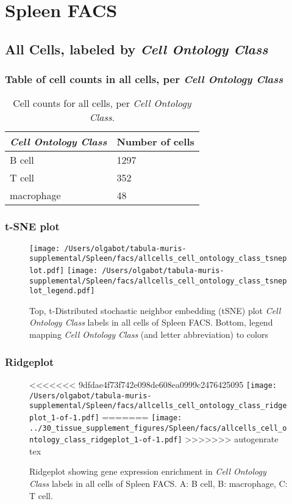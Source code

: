 \clearpage
\section{Spleen FACS}

\subsection{All Cells, labeled by \emph{Cell Ontology Class}}
\subsubsection{Table of cell counts in all cells, per \emph{Cell Ontology Class}}\begin{table}[h]
\centering
\label{my-label}
\begin{tabular}{@{}ll@{}}
\toprule

\emph{Cell Ontology Class}& Number of cells \\ \midrule
B cell & 1297 \\

T cell & 352 \\

macrophage & 48 \\
\bottomrule
\end{tabular}
\caption{Cell counts for all cells, per \emph{Cell Ontology Class}.}
\end{table}

\clearpage
\subsubsection{t-SNE plot}
\begin{figure}[h]
\centering
\texttt{[image: /Users/olgabot/tabula-muris-supplemental/Spleen/facs/allcells\_cell\_ontology\_class\_tsneplot.pdf]}
\texttt{[image: /Users/olgabot/tabula-muris-supplemental/Spleen/facs/allcells\_cell\_ontology\_class\_tsneplot\_legend.pdf]}
\caption{Top, t-Distributed stochastic neighbor embedding (tSNE) plot  \emph{Cell Ontology Class} labels in all cells of Spleen FACS. Bottom, legend mapping \emph{Cell Ontology Class} (and letter abbreviation) to colors}
\end{figure}


\clearpage

\subsubsection{Ridgeplot}
\begin{figure}[h]
\centering
<<<<<<< 9dfdae4f73f742e098de608ea0999c2476425095
\texttt{[image: /Users/olgabot/tabula-muris-supplemental/Spleen/facs/allcells\_cell\_ontology\_class\_ridgeplot\_1-of-1.pdf]}
=======
\texttt{[image: ../30\_tissue\_supplement\_figures/Spleen/facs/allcells\_cell\_ontology\_class\_ridgeplot\_1-of-1.pdf]}
>>>>>>> autogenrate tex

\caption{ Ridgeplot  showing gene expression enrichment in \emph{Cell Ontology Class} labels in all cells of Spleen FACS. A: B cell, B: macrophage, C: T cell.}
\end{figure}


